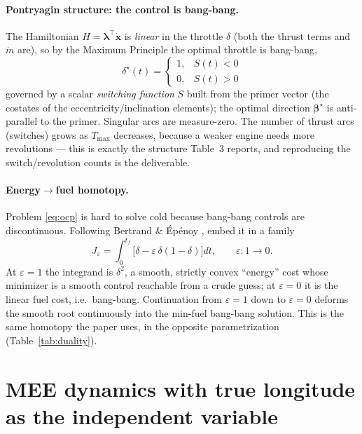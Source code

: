 \documentclass[11pt]{article}
\newcommand{\bv}{\boldsymbol{\beta}}
\newcommand{\xv}{\mathbf{x}}
\newcommand{\Tmax}{T_{\max}}
\begin{document}
\paragraph{Pontryagin structure: the control is bang-bang.} The Hamiltonian
$H=\boldsymbol{\lambda}^\top\dot{\xv}$ is \emph{linear} in the throttle $\delta$
(both the thrust terms and $\dot m$ are), so by the Maximum Principle the optimal
throttle is bang-bang,
\begin{equation}
\delta^\star(t)=\begin{cases}1,& S(t)<0\\ 0,& S(t)>0\end{cases}
\end{equation}
governed by a scalar \emph{switching function} $S$ built from the primer vector
(the costates of the eccentricity/inclination elements); the optimal direction
$\bv^\star$ is anti-parallel to the primer. Singular arcs are measure-zero. The
number of thrust arcs (switches) grows as $\Tmax$ decreases, because a weaker
engine needs more revolutions --- this is exactly the structure Table~3 reports,
and reproducing the switch/revolution counts is the deliverable.

\paragraph{Energy$\to$fuel homotopy.} Problem \eqref{eq:ocp} is hard to solve
cold because bang-bang controls are discontinuous. Following Bertrand \& \'Ep\'enoy
\cite{be2002}, embed it in a family
\begin{equation}
J_\varepsilon=\int_0^{t_f}\Big[\delta-\varepsilon\,\delta(1-\delta)\Big]dt,
\qquad \varepsilon:1\to0.
\end{equation}
At $\varepsilon=1$ the integrand is $\delta^2$, a smooth, strictly convex
``energy'' cost whose minimizer is a smooth control reachable from a crude guess;
at $\varepsilon=0$ it is the linear fuel cost, i.e.\ bang-bang. Continuation from
$\varepsilon=1$ down to $\varepsilon=0$ deforms the smooth root continuously into
the min-fuel bang-bang solution. This is the same homotopy the paper uses, in the
opposite parametrization (Table~\ref{tab:duality}).

\section{MEE dynamics with true longitude as the independent variable}
\label{sec:mee}
\end{document}
